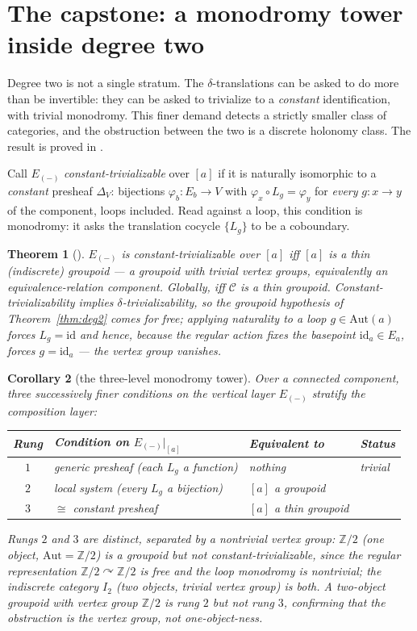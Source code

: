 \documentclass[11pt]{article}
\newtheorem{theorem}{Theorem}
\newtheorem{corollary}[theorem]{Corollary}
\theoremstyle{definition}
\newcommand{\Aut}{\mathrm{Aut}}
\newcommand{\Z}{\mathbb{Z}}
\newcommand{\id}{\mathrm{id}}
\newcommand{\cC}{\mathcal{C}}
\begin{document}
\section{The capstone: a monodromy tower inside degree two}\label{sec:tower}

Degree two is not a single stratum. The $\delta$-translations can be asked to do more than be
invertible: they can be asked to trivialize to a \emph{constant} identification, with trivial
monodromy. This finer demand detects a strictly smaller class of categories, and the obstruction
between the two is a discrete holonomy class. The result is proved in \cite{MacBethThin}.

Call $E_{(-)}$ \emph{constant-trivializable} over $[a]$ if it is naturally isomorphic to a
\emph{constant} presheaf $\Delta_V$: bijections $\varphi_b\colon E_b\to V$ with
$\varphi_x\circ L_g=\varphi_y$ for \emph{every} $g\colon x\to y$ of the component, loops included.
Read against a loop, this condition is monodromy: it asks the translation cocycle $\{L_g\}$ to be a
coboundary.

\begin{theorem}[\cite{MacBethThin}]\label{thm:thin}
$E_{(-)}$ is constant-trivializable over $[a]$ iff $[a]$ is a \emph{thin} (indiscrete) groupoid ---
a groupoid with trivial vertex groups, equivalently an equivalence-relation component. Globally,
iff $\cC$ is a thin groupoid. Constant-trivializability implies $\delta$-trivializability, so the
groupoid hypothesis of Theorem~\ref{thm:deg2} comes for free; applying naturality to a loop
$g\in\Aut(a)$ forces $L_g=\id$ and hence, because the regular action fixes the basepoint
$\id_a\in E_a$, forces $g=\id_a$ --- the vertex group vanishes.
\end{theorem}

\begin{corollary}[the three-level monodromy tower]\label{cor:tower}
Over a connected component, three successively finer conditions on the vertical layer $E_{(-)}$
stratify the composition layer:
\begin{center}
\begin{tabular}{@{}clll@{}}
\toprule
Rung & Condition on $E_{(-)}\big|_{[a]}$ & Equivalent to & Status \\
\midrule
$1$ & generic presheaf (each $L_g$ a function) & nothing & trivial \\
$2$ & local system (every $L_g$ a bijection) & $[a]$ a groupoid & \cite{MacBethDelta} \\
$3$ & $\cong$ constant presheaf & $[a]$ a thin groupoid & \cite{MacBethThin} \\
\bottomrule
\end{tabular}
\end{center}
Rungs $2$ and $3$ are distinct, separated by a nontrivial vertex group: $\Z/2$ (one object,
$\Aut=\Z/2$) is a groupoid but not constant-trivializable, since the regular representation
$\Z/2\curvearrowright\Z/2$ is free and the loop monodromy is nontrivial; the indiscrete category
$I_2$ (two objects, trivial vertex group) is both. A two-object groupoid with vertex group $\Z/2$
is rung $2$ but not rung $3$, confirming that the obstruction is the \emph{vertex group}, not
one-object-ness.
\end{corollary}
\end{document}
